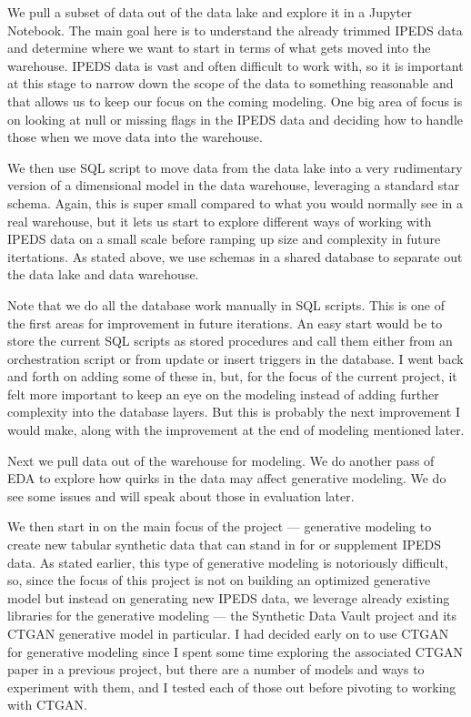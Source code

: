 \documentclass[sigconf, authorversion, nonacm]{acmart}
\begin{document}
    We pull a subset of data out of the data lake and explore it in a Jupyter Notebook. The main goal here is to understand the already trimmed IPEDS data and determine where we want to start in terms of what gets moved into the warehouse. IPEDS data is vast and often difficult to work with, so it is important at this stage to narrow down the scope of the data to something reasonable and that allows us to keep our focus on the coming modeling. One big area of focus is on looking at null or missing flags in the IPEDS data and deciding how to handle those when we move data into the warehouse.

    We then use SQL script to move data from the data lake into a very rudimentary version of a dimensional model in the data warehouse, leveraging a standard star schema. Again, this is super small compared to what you would normally see in a real warehouse, but it lets us start to explore different ways of working with IPEDS data on a small scale before ramping up size and complexity in future itertations. As stated above, we use schemas in a shared database to separate out the data lake and data warehouse.

    Note that we do all the database work manually in SQL scripts. This is one of the first areas for improvement in future iterations. An easy start would be to store the current SQL scripts as stored procedures and call them either from an orchestration script or from update or insert triggers in the database. I went back and forth on adding some of these in, but, for the focus of the current project, it felt more important to keep an eye on the modeling instead of adding further complexity into the database layers. But this is probably the next improvement I would make, along with the improvement at the end of modeling mentioned later.

    Next we pull data out of the warehouse for modeling. We do another pass of EDA to explore how quirks in the data may affect generative modeling. We do see some issues and will speak about those in evaluation later.

    We then start in on the main focus of the project --- generative modeling to create new tabular synthetic data that can stand in for or supplement IPEDS data. As stated earlier, this type of generative modeling is notoriously difficult, so, since the focus of this project is not on building an optimized generative model but instead on generating new IPEDS data, we leverage already existing libraries for the generative modeling --- the Synthetic Data Vault project and its CTGAN generative model in particular. I had decided early on to use CTGAN for generative modeling since I spent some time exploring the associated CTGAN paper in a previous project, but there are a number of models and ways to experiment with them, and I tested each of those out before pivoting to working with CTGAN.
\end{document}
